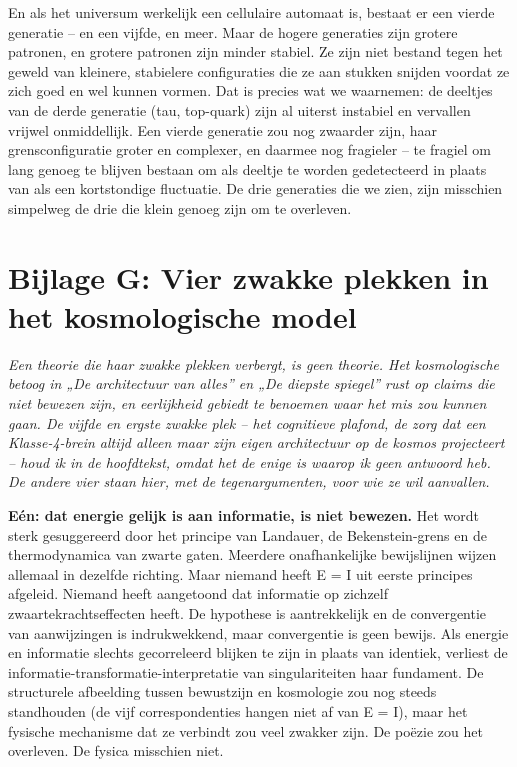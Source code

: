 \documentclass[11pt, twoside, openright]{book}
\begin{document}
En als het universum werkelijk een cellulaire automaat is, bestaat er een vierde generatie -- en een vijfde, en meer. Maar de hogere generaties zijn grotere patronen, en grotere patronen zijn minder stabiel. Ze zijn niet bestand tegen het geweld van kleinere, stabielere configuraties die ze aan stukken snijden voordat ze zich goed en wel kunnen vormen. Dat is precies wat we waarnemen: de deeltjes van de derde generatie (tau, top-quark) zijn al uiterst instabiel en vervallen vrijwel onmiddellijk. Een vierde generatie zou nog zwaarder zijn, haar grensconfiguratie groter en complexer, en daarmee nog fragieler -- te fragiel om lang genoeg te blijven bestaan om als deeltje te worden gedetecteerd in plaats van als een kortstondige fluctuatie. De drie generaties die we zien, zijn misschien simpelweg de drie die klein genoeg zijn om te overleven.


\chapter*{Bijlage G: Vier zwakke plekken in het kosmologische model}

\textit{Een theorie die haar zwakke plekken verbergt, is geen theorie. Het kosmologische betoog in „De architectuur van alles” en „De diepste spiegel” rust op claims die niet bewezen zijn, en eerlijkheid gebiedt te benoemen waar het mis zou kunnen gaan. De vijfde en ergste zwakke plek -- het cognitieve plafond, de zorg dat een Klasse-4-brein altijd alleen maar zijn eigen architectuur op de kosmos projecteert -- houd ik in de hoofdtekst, omdat het de enige is waarop ik geen antwoord heb. De andere vier staan hier, met de tegenargumenten, voor wie ze wil aanvallen.}

\textbf{Eén: dat energie gelijk is aan informatie, is niet bewezen.} Het wordt sterk gesuggereerd door het principe van Landauer, de Bekenstein-grens en de thermodynamica van zwarte gaten. Meerdere onafhankelijke bewijslijnen wijzen allemaal in dezelfde richting. Maar niemand heeft E = I uit eerste principes afgeleid. Niemand heeft aangetoond dat informatie op zichzelf zwaartekrachtseffecten heeft. De hypothese is aantrekkelijk en de convergentie van aanwijzingen is indrukwekkend, maar convergentie is geen bewijs. Als energie en informatie slechts gecorreleerd blijken te zijn in plaats van identiek, verliest de informatie-transformatie-interpretatie van singulariteiten haar fundament. De structurele afbeelding tussen bewustzijn en kosmologie zou nog steeds standhouden (de vijf correspondenties hangen niet af van E = I), maar het fysische mechanisme dat ze verbindt zou veel zwakker zijn. De poëzie zou het overleven. De fysica misschien niet.
\end{document}
